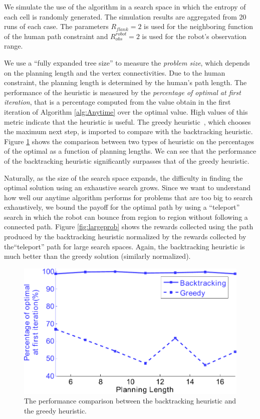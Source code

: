 We simulate the use of the algorithm in a search space in which the entropy of each cell is randomly generated.
The simulation results are aggregated from 20 runs of each case.
The parameters $ R_{flank} = 2 $ is used for the neighboring function of the human path constraint and $ R^{robot}_{obs} = 2 $ is used for the robot's observation range.

We use a ``fully expanded tree size'' to measure the \emph{problem size}, which depends on the planning length and the vertex connectivities.
Due to the human constraint, the planning length is determined by the human's path length.
The performance of the heuristic is measured by the \emph{percentage of optimal at first iteration}, that is a percentage computed from the value obtain in the first iteration of Algorithm \ref{alg:Anytime} over the optimal value.
High values of this metric indicate that the heuristic is useful.
The greedy heuristic~\cite{singh2009efficient}, which chooses the maximum next step, is imported to compare with the backtracking heuristic.
Figure \ref{fig:compareGreedy} shows the comparison between two types of heuristic on the percentages of the optimal as a function of planning lengths.
We can see that the performance of the backtracking heuristic significantly surpasses that of the greedy heuristic.

Naturally, as the size of the search space expands, the difficulty in finding the optimal solution using an exhaustive search grows.  Since we want to understand how well our anytime algorithm performs for problems that are too big to search exhaustively, we bound the payoff for the optimal path by using a ``teleport'' search in which the robot can bounce from region to region without following a connected path.
Figure \ref{fig:largeprob} shows the rewards collected using the path produced by the backtracking heuristic normalized by the rewards collected by the``teleport'' path for large search spaces. Again, the backtracking heuristic is  much better than the greedy solution (similarly normalized).

\begin{figure}
\centering
\includegraphics[width=0.7\linewidth]{./images/compareGreedy}
\caption{The performance comparison between the backtracking heuristic and the greedy heuristic.}
\label{fig:compareGreedy}
\end{figure}

